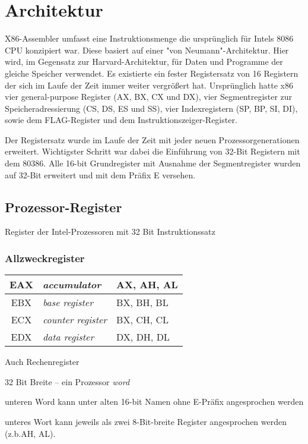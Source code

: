 \section{Architektur}
X86-Assembler umfasst eine Instruktionsmenge die ursprünglich für Intels 8086 CPU konzipiert war. Diese basiert auf einer "von Neumann"-Architektur. Hier wird, im Gegensatz zur Harvard-Architektur, für Daten und Programme der gleiche Speicher verwendet. Es existierte ein fester Registersatz von 16 Registern der sich im Laufe der Zeit immer weiter vergrößert hat. Ursprünglich hatte x86 vier general-purpose Register (AX, BX, CX und DX), vier Segmentregister zur Speicheradressierung (CS, DS, ES und SS), vier Indexregistern (SP, BP, SI, DI), sowie dem FLAG-Register und dem Instruktionszeiger-Register.

Der Registersatz wurde im Laufe der Zeit mit jeder neuen Prozessorgenerationen erweitert. Wichtigster Schritt war dabei die Einführung von 32-Bit Registern mit dem 80386. Alle 16-bit Grundregister mit Ausnahme der Segmentregister wurden auf 32-Bit erweitert und mit dem Präfix E versehen.

\subsection{Prozessor-Register}

Register der Intel-Prozessoren mit 32 Bit Instruktionssatz

\subsubsection{Allzweckregister}

\begin{tabular}{|c|l|l|}
\hline EAX & \emph{accumulator} & AX, AH, AL
\\
\hline EBX & \emph{base register} & BX, BH, BL
\\
\hline ECX & \emph{counter register} & BX, CH, CL
\\
\hline EDX & \emph{data register} & DX, DH, DL
\\
\hline \end{tabular}

Auch Rechenregister

32 Bit Breite – ein Prozessor \emph{word}

unteren Word kann unter alten 16-bit Namen ohne E-Präfix angesprochen werden

unteres Wort kann jeweils als zwei 8-Bit-breite Register angesprochen werden (z.b.AH, AL).

